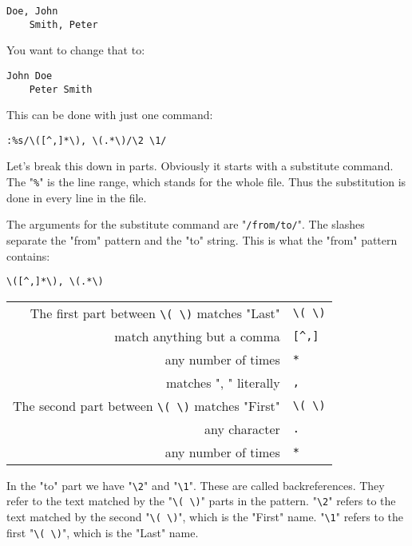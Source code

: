 \begin{Verbatim}[samepage=true]
    Doe, John 
    Smith, Peter 
\end{Verbatim}

You want to change that to:

\begin{Verbatim}[samepage=true]
    John Doe 
    Peter Smith 
\end{Verbatim}

This can be done with just one command:

\begin{Verbatim}[samepage=true]
 :%s/\([^,]*\), \(.*\)/\2 \1/
\end{Verbatim}

Let's break this down in parts.
Obviously it starts with a substitute command.
The "\texttt{\%}" is the line range, which stands for the whole file.
Thus the substitution is done in every line in the file.

The arguments for the substitute command are "\texttt{/from/to/}".
The slashes separate the "from" pattern and the "to" string.
This is what the "from" pattern contains:

\begin{Verbatim}[samepage=true]
	\([^,]*\), \(.*\) 
\end{Verbatim}

\begin{center}
				\begin{longtable}{r l}
								The first part between \texttt{\textbackslash{}( \textbackslash{})} matches "Last" & \texttt{\textbackslash{}( \textbackslash{})} \\
								match anything but a comma & \texttt{[\^{},]} \\
								any number of times & \texttt{*} \\
								matches ", " literally & \texttt{,} \\
								The second part between \texttt{\textbackslash{}( \textbackslash{})} matches "First" & \texttt{\textbackslash{}(  \textbackslash{})} \\
								any character & \texttt{.} \\
								any number of times & \texttt{*} \\
				\end{longtable}
\end{center}

In the "to" part we have "\texttt{\textbackslash{}2}" and "\texttt{\textbackslash{}1}".
These are called backreferences.
They refer to the text matched by the "\texttt{\textbackslash{}( \textbackslash{})}" parts in the pattern.
"\texttt{\textbackslash{}2}" refers to the text matched by the second "\texttt{\textbackslash{}( \textbackslash{})}", which is the "First" name.
"\texttt{\textbackslash{}1}" refers to the first "\texttt{\textbackslash{}( \textbackslash{})}", which is the "Last" name.

